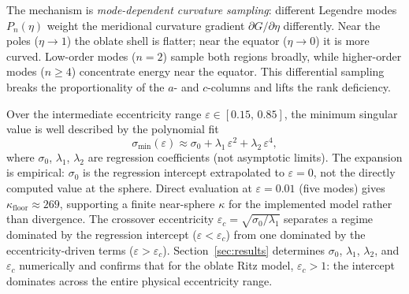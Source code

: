 The mechanism is \emph{mode-dependent curvature sampling}: different
Legendre modes $P_n(\eta)$ weight the meridional curvature gradient
$\partial G / \partial \eta$ differently.  Near the poles ($\eta \to 1$) the
oblate shell is flatter; near the equator ($\eta \to 0$) it is more curved.
Low-order modes ($n=2$) sample both regions broadly, while higher-order modes
($n \geq 4$) concentrate energy near the equator.  This differential sampling
breaks the proportionality of the $a$- and $c$-columns and lifts the rank
deficiency.

Over the intermediate eccentricity range $\varepsilon \in [0.15,\,0.85]$,
the minimum singular value is well described by the polynomial fit
\begin{equation}\label{eq:sigma_min_expansion}
  \sigma_{\min}(\varepsilon)
  \approx
  \sigma_0 + \lambda_1\,\varepsilon^{2} + \lambda_2\,\varepsilon^{4},
\end{equation}
where $\sigma_0$, $\lambda_1$, $\lambda_2$ are regression coefficients
(not asymptotic limits).  The expansion is empirical: $\sigma_0$ is the
regression intercept extrapolated to $\varepsilon = 0$, not the directly
computed value at the sphere.  Direct evaluation at $\varepsilon = 0.01$
(five modes) gives $\kappa_\mathrm{floor} \approx 269$, supporting a finite
near-sphere $\kappa$ for the implemented model rather than divergence.
The crossover eccentricity
$\varepsilon_c = \sqrt{\sigma_0/\lambda_1}$ separates a regime dominated
by the regression intercept ($\varepsilon < \varepsilon_c$) from one
dominated by the eccentricity-driven terms ($\varepsilon > \varepsilon_c$).
Section~\ref{sec:results} determines
$\sigma_0$, $\lambda_1$, $\lambda_2$, and $\varepsilon_c$ numerically and
confirms that for the oblate Ritz model, $\varepsilon_c > 1$: the intercept
dominates across the entire physical eccentricity range.
